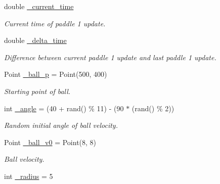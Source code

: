 \begin{DoxyCompactItemize}
\hypertarget{class_c_pong_a6048586a1f4a5f62a4a3af9f94ea8788}{}\label{class_c_pong_a6048586a1f4a5f62a4a3af9f94ea8788} 
double \hyperlink{class_c_pong_a6048586a1f4a5f62a4a3af9f94ea8788}{\+\_\+current\+\_\+time}
\begin{DoxyCompactList}\small\item\em Current time of paddle 1 update. \end{DoxyCompactList}\item 
\hypertarget{class_c_pong_a7583e71852daec33bfd16db26be2dcac}{}\label{class_c_pong_a7583e71852daec33bfd16db26be2dcac} 
double \hyperlink{class_c_pong_a7583e71852daec33bfd16db26be2dcac}{\+\_\+delta\+\_\+time}
\begin{DoxyCompactList}\small\item\em Difference between current paddle 1 update and last paddle 1 update. \end{DoxyCompactList}\item 
\hypertarget{class_c_pong_a2dcb0a8edc2d979afb4741f6b81d4897}{}\label{class_c_pong_a2dcb0a8edc2d979afb4741f6b81d4897} 
Point \hyperlink{class_c_pong_a2dcb0a8edc2d979afb4741f6b81d4897}{\+\_\+ball\+\_\+p} = Point(500, 400)
\begin{DoxyCompactList}\small\item\em Starting point of ball. \end{DoxyCompactList}\item 
\hypertarget{class_c_pong_a9836ae473b6abb4d481ee458ef9d82f1}{}\label{class_c_pong_a9836ae473b6abb4d481ee458ef9d82f1} 
int \hyperlink{class_c_pong_a9836ae473b6abb4d481ee458ef9d82f1}{\+\_\+angle} = (40 + rand() \% 11) -\/ (90 $\ast$ (rand() \% 2))
\begin{DoxyCompactList}\small\item\em Random initial angle of ball velocity. \end{DoxyCompactList}\item 
\hypertarget{class_c_pong_a9ea3051b252fbbe4b4e6a284b23d7a41}{}\label{class_c_pong_a9ea3051b252fbbe4b4e6a284b23d7a41} 
Point \hyperlink{class_c_pong_a9ea3051b252fbbe4b4e6a284b23d7a41}{\+\_\+ball\+\_\+v0} = Point(8, 8)
\begin{DoxyCompactList}\small\item\em Ball velocity. \end{DoxyCompactList}\item 
\hypertarget{class_c_pong_a26d9ccea9268c6d406557e46f13250db}{}\label{class_c_pong_a26d9ccea9268c6d406557e46f13250db} 
int \hyperlink{class_c_pong_a26d9ccea9268c6d406557e46f13250db}{\+\_\+radius} = 5

\end{DoxyCompactItemize}

